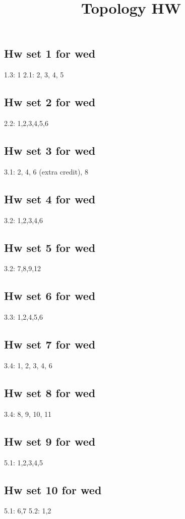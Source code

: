 \documentclass{amsart}
\numberwithin{equation}{section}
\theoremstyle{definition}
\theoremstyle{remark}
\begin{document}
\title{Topology HW}
\maketitle
\subsection*{Hw set 1 for wed}
1.3: 1  
2.1: 2, 3, 4, 5  
\subsection*{Hw set 2 for wed}
2.2: 1,2,3,4,5,6
\subsection*{Hw set 3 for wed}
3.1: 2, 4, 6 (extra credit), 8
\subsection*{Hw set 4 for wed}
3.2: 1,2,3,4,6
\subsection*{Hw set 5 for wed}
3.2: 7,8,9,12
\subsection*{Hw set 6 for wed}
3.3: 1,2,4,5,6   
\subsection*{Hw set 7 for wed}
3.4: 1, 2, 3, 4, 6
\subsection*{Hw set 8 for wed}
3.4: 8, 9, 10, 11
\subsection*{Hw set 9 for wed}
5.1: 1,2,3,4,5
\subsection*{Hw set 10 for wed}
5.1: 6,7
5.2: 1,2   
\end{document}
